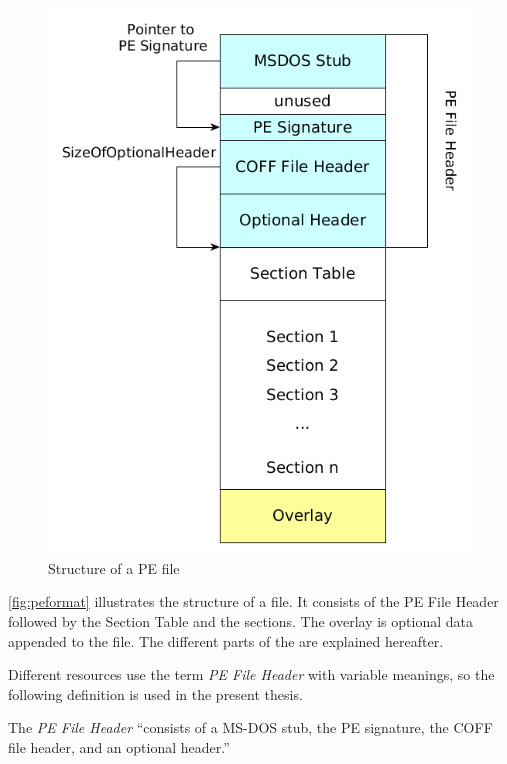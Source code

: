 \begin{figure}
\centering
\includegraphics[width=.98\textwidth, height=.60\textheight,keepaspectratio]{graphics/peformat}
\caption{Structure of a PE file}
\label{fig:peformat} 
\end{figure}

\autoref{fig:peformat} illustrates the structure of a \PE{} file. It consists of the PE File Header followed by the Section Table and the sections. The overlay is optional data appended to the file. The different parts of the \PE{} are explained hereafter. 

Different resources use the term \emph{PE File Header} with variable meanings, so the following definition is used in the present thesis. 
\begin{definition}
The \emph{PE File Header} \enquote{consists of a MS-DOS stub, the PE signature, the COFF file header, and an optional header.} \cite[]{pespec}
\end{definition} 

